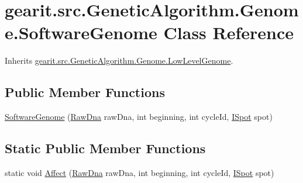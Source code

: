 \hypertarget{classgearit_1_1src_1_1_genetic_algorithm_1_1_genome_1_1_software_genome}{\section{gearit.\+src.\+Genetic\+Algorithm.\+Genome.\+Software\+Genome Class Reference}
\label{classgearit_1_1src_1_1_genetic_algorithm_1_1_genome_1_1_software_genome}
}


Inherits \hyperlink{classgearit_1_1src_1_1_genetic_algorithm_1_1_genome_1_1_low_level_genome}{gearit.\+src.\+Genetic\+Algorithm.\+Genome.\+Low\+Level\+Genome}.

\subsection*{Public Member Functions}
\begin{DoxyCompactItemize}
\item 
\hyperlink{classgearit_1_1src_1_1_genetic_algorithm_1_1_genome_1_1_software_genome_a072d304ca1ebae43b1c55b5fa184d9d9}{Software\+Genome} (\hyperlink{classgearit_1_1src_1_1_genetic_algorithm_1_1_genome_1_1_raw_dna}{Raw\+Dna} raw\+Dna, int beginning, int cycle\+Id, \hyperlink{interfacegearit_1_1src_1_1robot_1_1_i_spot}{I\+Spot} spot)
\end{DoxyCompactItemize}
\subsection*{Static Public Member Functions}
\begin{DoxyCompactItemize}
\item 
static void \hyperlink{classgearit_1_1src_1_1_genetic_algorithm_1_1_genome_1_1_software_genome_a81df9fdd57606b6bb22d95e84327229e}{Affect} (\hyperlink{classgearit_1_1src_1_1_genetic_algorithm_1_1_genome_1_1_raw_dna}{Raw\+Dna} raw\+Dna, int beginning, int cycle\+Id, \hyperlink{interfacegearit_1_1src_1_1robot_1_1_i_spot}{I\+Spot} spot)
\end{DoxyCompactItemize}


